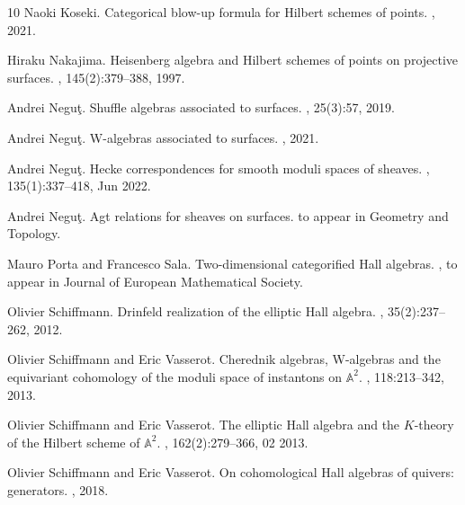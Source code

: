 \documentclass{amsart}
\numberwithin{equation}{section}
\theoremstyle{definition}
\theoremstyle{remark}
\begin{document}
\begin{thebibliography}{10}
Naoki Koseki.
\newblock Categorical blow-up formula for {Hilbert} schemes of points.
, 2021.

Hiraku Nakajima.
\newblock Heisenberg algebra and {Hilbert} schemes of points on projective
  surfaces.
, 145(2):379--388, 1997.

Andrei Negu\c{t}.
\newblock Shuffle algebras associated to surfaces.
, 25(3):57, 2019.

Andrei Negu{\c{t}}.
\newblock W-algebras associated to surfaces.
,
  2021.

Andrei Negu{\c{t}}.
\newblock Hecke correspondences for smooth moduli spaces of sheaves.
, 135(1):337--418,
  Jun 2022.

Andrei Negu{\c{t}}.
\newblock Agt relations for sheaves on surfaces.
\newblock to appear in Geometry and Topology.

Mauro Porta and Francesco Sala.
\newblock Two-dimensional categorified {H}all algebras.
, to appear in Journal of
  European Mathematical Society.

Olivier Schiffmann.
\newblock Drinfeld realization of the elliptic {H}all algebra.
, 35(2):237--262, 2012.

Olivier Schiffmann and Eric Vasserot.
\newblock Cherednik algebras, {W}-algebras and the equivariant cohomology of
  the moduli space of instantons on {$\mathbb{A}^2$}.
, 118:213--342, 2013.

Olivier Schiffmann and Eric Vasserot.
\newblock The elliptic {H}all algebra and the {$K$}-theory of the {H}ilbert
  scheme of {$\mathbb{A}^{2}$}.
, 162(2):279--366, 02 2013.

Olivier Schiffmann and Eric Vasserot.
\newblock On cohomological {H}all algebras of quivers: generators.
, 2018.


\end{thebibliography}
\end{document}
